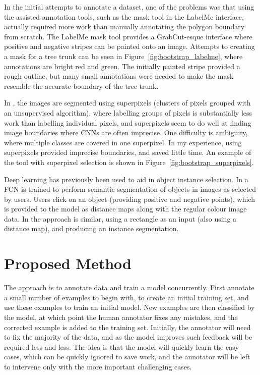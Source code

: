 In the initial attempts to annotate a dataset, one of the problems was that using the assisted annotation tools, such as the mask tool in the LabelMe \cite{Russell2007} interface, actually required more work than manually annotating the polygon boundary from scratch. The LabelMe mask tool provides a GrabCut-esque interface where positive and negative stripes can be painted onto an image. Attempts to creating a mask for a tree trunk can be seen in Figure~\ref{fig:bootstrap_labelme}, where annotations are bright red and green. The initially painted stripe provided a rough outline, but many small annotations were needed to make the mask resemble the accurate boundary of the tree trunk.

In \cite{Galloway2017}, the images are segmented using superpixels (clusters of pixels grouped with an unsupervised algorithm), where labelling groups of pixels is substantially less work than labelling individual pixels, and superpixels seem to do well at finding image boundaries where \gls{CNN}s are often imprecise. One difficulty is ambiguity, where multiple classes are covered in one superpixel. In my experience, using superpixels provided imprecise boundaries, and saved little time. An example of the tool with superpixel selection is shown in Figure~\ref{fig:bootstrap_superpixels}.

Deep learning has previously been used to aid in object instance selection. In \cite{Xu2016} a \gls{FCN} is trained to perform semantic segmentation of objects in images as selected by users. Users click on an object (providing positive and negative points), which is provided to the model as distance maps along with the regular colour image data. In \cite{Xu2017} the approach is similar, using a rectangle as an input (also using a distance map), and producing an instance segmentation.


\section{Proposed Method}

The approach is to annotate data and train a model concurrently. First annotate a small number of examples to begin with, to create an initial training set, and use these examples to train an initial model. New examples are then classified by the model, at which point the human annotator fixes any mistakes, and the corrected example is added to the training set. Initially, the annotator will need to fix the majority of the data, and as the model improves such feedback will be required less and less. The idea is that the model will quickly learn the easy cases, which can be quickly ignored to save work, and the annotator will be left to intervene only with the more important challenging cases.


